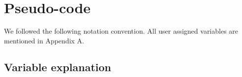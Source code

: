 \documentclass[runningheads]{llncs}
\begin{document}


\section{Pseudo-code}
\label{secPseu}
We followed the following notation convention. All user assigned variables are mentioned in Appendix A.
\subsection{Variable explanation}
\end{document}
